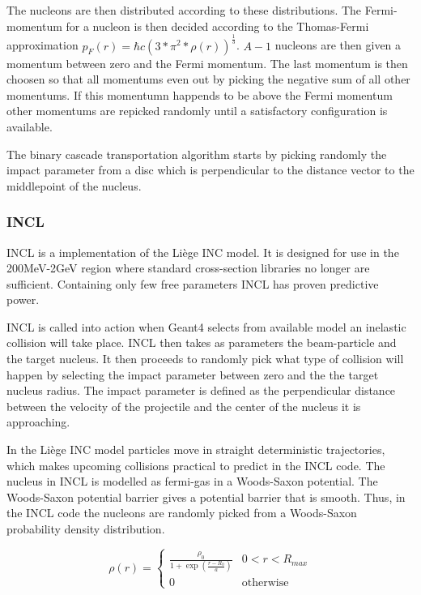 The nucleons are then distributed according to these distributions. The Fermi-momentum for a nucleon is then decided according to the Thomas-Fermi approximation $p_F(r) = \hbar c (3*\pi^2*\rho(r))^\frac{1}{3}$. $A-1$ nucleons are then given a momentum between zero and the Fermi momentum. The last momentum is then choosen so that all momentums even out by picking the negative sum of all other momentums. If this momentumn happends to be above the Fermi momentum other momentums are repicked randomly until a satisfactory configuration is available.

The binary cascade transportation algorithm starts by picking randomly the impact parameter from a disc which is perpendicular to the distance vector to the middlepoint of the nucleus.

\subsubsection{INCL}

INCL is a implementation of the Liège INC model. It is designed for use in the 200MeV-2GeV region where standard cross-section libraries no longer are sufficient. Containing only few free parameters INCL has proven predictive power.

INCL is called into action when Geant4 selects from available model an inelastic collision will take place. INCL then takes as parameters the beam-particle and the target nucleus. It then proceeds to randomly pick what type of collision will happen by selecting the impact parameter between zero and the the target nucleus radius. The impact parameter is defined as the perpendicular distance between the velocity of the projectile and the center of the nucleus it is approaching.

In the Liège INC model particles move in straight deterministic trajectories, which makes upcoming collisions practical to predict in the INCL code.
 The nucleus in INCL is modelled as fermi-gas in a Woods-Saxon potential. %
 The Woods-Saxon potential barrier gives a potential barrier that is smooth. Thus, in the INCL code the nucleons are randomly picked from a Woods-Saxon probability density distribution.

\begin{equation}
\rho(r) = \begin{cases}
\frac{\rho_{0}}{1+\exp({\frac{r-R_{0}}{a}})} & 0 < r < R_{max} \\
0 & \text{otherwise}
\end{cases}
\label{WoodsSaxon2}
\end{equation}

